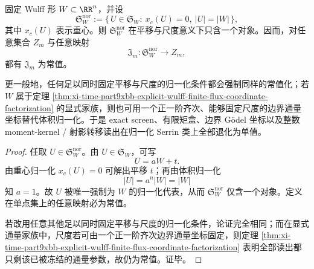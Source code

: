 \begin{corollary}\label{cor:xi-time-part9xbb-normalized-serrin-holography-trivialization}
固定 Wulff 形 \(W\subset\RR^n\)，并设
\[
\mathfrak S_W^{\mathrm{nor}}
:=
\{\,U\in\mathfrak S_W:\ x_c(U)=0,\ |U|=|W|\,\},
\]
其中 \(x_c(U)\) 表示重心。则 \(\mathfrak S_W^{\mathrm{nor}}\) 在平移与尺度意义下只含一个对象。因而，对任意集合 \(Z_m\) 与任意映射
\[
\mathfrak J_m:\mathfrak S_W^{\mathrm{nor}}\to Z_m,
\]
都有 \(\mathfrak J_m\) 为常值。

更一般地，任何足以同时固定平移与尺度的归一化条件都会强制同样的常值化；若 \(W\) 属于定理 \ref{thm:xi-time-part9xbb-explicit-wulff-finite-flux-coordinate-factorization} 的显式家族，则也可用一个正一阶齐次、能够固定尺度的边界通量坐标替代体积归一化。于是 exact screen、有限矩盒、边界 Gödel 坐标以及整数 moment-kernel / 射影转移读出在归一化 Serrin 类上全部退化为单值。
\end{corollary}
\begin{proof}
任取 \(U\in\mathfrak S_W^{\mathrm{nor}}\)。由 \(U\in \mathfrak S_W\)，可写
\[
U=aW+t.
\]
由重心归一化 \(x_c(U)=0\) 可解出平移 \(t\)；再由体积归一化
\[
|U|=a^n|W|=|W|
\]
知 \(a=1\)。故 \(U\) 被唯一强制为 \(W\) 的归一化代表，从而 \(\mathfrak S_W^{\mathrm{nor}}\) 仅含一个对象。定义在单点集上的任意映射必为常值。

若改用任意其他足以同时固定平移与尺度的归一化条件，论证完全相同；而在显式通量家族中，尺度若可由一个正一阶齐次边界通量坐标固定，则定理 \ref{thm:xi-time-part9xbb-explicit-wulff-finite-flux-coordinate-factorization} 表明全部读出都只剩该已被冻结的通量参数，故仍为常值。证毕。
\end{proof}

